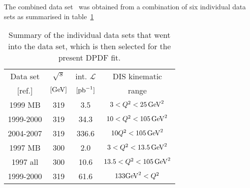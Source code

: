 \documentclass[12pt]{article}
\begin{document}
The combined data set \HIcomb\ was obtained from a combination of six individual data sets as summarised in table~\ref{tab:datasetsComb}
\begin{table}[tbhp]
  \footnotesize
  \begin{center}
    \begin{tabular}{cccc}
      \hline
      \multicolumn{1}{c}{Data set} & $\sqrt{s}$ & int. $\mathcal{L}$ & DIS kinematic  \\  
      \multicolumn{1}{c}{[ref.]}  & $[\mathrm{GeV}]$   & $[{\rm pb}^{-1}]$  &  range         \\   
      \hline
      1999 MB   & 319 & 3.5  & $3<Q^{2}<25\,\mathrm{GeV}^2$   \\
      1999-2000 & 319 & 34.3 & $10< Q^{2}<105\,\mathrm{GeV}^2 $   \\
      2004-2007 & 319 & 336.6 & $10 Q^{2}<105\,\mathrm{GeV}^2 $   \\
      \hline
      1997 MB   & 300 & 2.0 & $3<Q^{2}<13.5\,\mathrm{GeV}^2$   \\
      1997 all  & 300 & 10.6 & $13.5<Q^{2}<105\,\mathrm{GeV}^2$   \\
      1999-2000 & 319 & 61.6 & $133\mathrm{GeV}^2 < Q^{2} $   \\
      \hline
    \end{tabular}
    \caption{
      Summary of the individual data sets that went into the \HIcomb data set, which
      is then selected for the present DPDF fit.
    }
    \label{tab:datasetsComb}
    \end{center}
\end{table}
\end{document}
